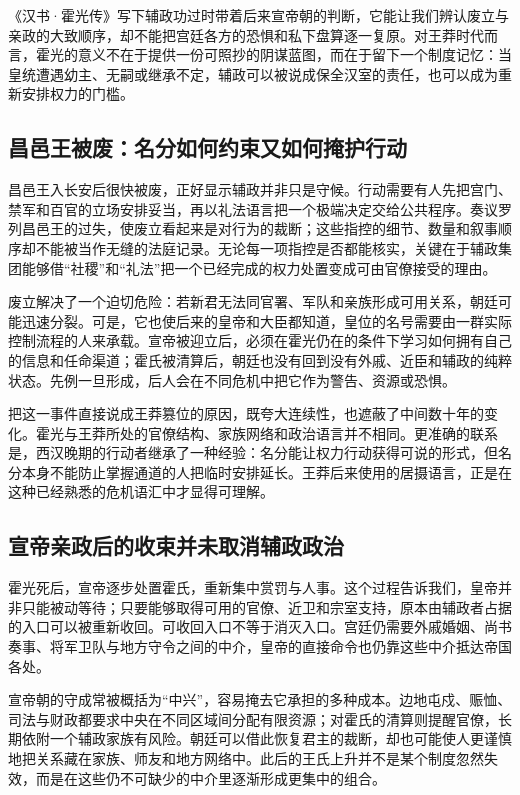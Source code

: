 《汉书·霍光传》写下辅政功过时带着后来宣帝朝的判断，它能让我们辨认废立与亲政的大致顺序，却不能把宫廷各方的恐惧和私下盘算逐一复原。对王莽时代而言，霍光的意义不在于提供一份可照抄的阴谋蓝图，而在于留下一个制度记忆：当皇统遭遇幼主、无嗣或继承不定，辅政可以被说成保全汉室的责任，也可以成为重新安排权力的门槛。

\subsection{昌邑王被废：名分如何约束又如何掩护行动}

昌邑王入长安后很快被废，正好显示辅政并非只是守候。行动需要有人先把宫门、禁军和百官的立场安排妥当，再以礼法语言把一个极端决定交给公共程序。奏议罗列昌邑王的过失，使废立看起来是对行为的裁断；这些指控的细节、数量和叙事顺序却不能被当作无缝的法庭记录。无论每一项指控是否都能核实，关键在于辅政集团能够借“社稷”和“礼法”把一个已经完成的权力处置变成可由官僚接受的理由。

废立解决了一个迫切危险：若新君无法同官署、军队和亲族形成可用关系，朝廷可能迅速分裂。可是，它也使后来的皇帝和大臣都知道，皇位的名号需要由一群实际控制流程的人来承载。宣帝被迎立后，必须在霍光仍在的条件下学习如何拥有自己的信息和任命渠道；霍氏被清算后，朝廷也没有回到没有外戚、近臣和辅政的纯粹状态。先例一旦形成，后人会在不同危机中把它作为警告、资源或恐惧。

把这一事件直接说成王莽篡位的原因，既夸大连续性，也遮蔽了中间数十年的变化。霍光与王莽所处的官僚结构、家族网络和政治语言并不相同。更准确的联系是，西汉晚期的行动者继承了一种经验：名分能让权力行动获得可说的形式，但名分本身不能防止掌握通道的人把临时安排延长。王莽后来使用的居摄语言，正是在这种已经熟悉的危机语汇中才显得可理解。

\subsection{宣帝亲政后的收束并未取消辅政政治}

霍光死后，宣帝逐步处置霍氏，重新集中赏罚与人事。这个过程告诉我们，皇帝并非只能被动等待；只要能够取得可用的官僚、近卫和宗室支持，原本由辅政者占据的入口可以被重新收回。可收回入口不等于消灭入口。宫廷仍需要外戚婚姻、尚书奏事、将军卫队与地方守令之间的中介，皇帝的直接命令也仍靠这些中介抵达帝国各处。

宣帝朝的守成常被概括为“中兴”，容易掩去它承担的多种成本。边地屯戍、赈恤、司法与财政都要求中央在不同区域间分配有限资源；对霍氏的清算则提醒官僚，长期依附一个辅政家族有风险。朝廷可以借此恢复君主的裁断，却也可能使人更谨慎地把关系藏在家族、师友和地方网络中。此后的王氏上升并不是某个制度忽然失效，而是在这些仍不可缺少的中介里逐渐形成更集中的组合。


